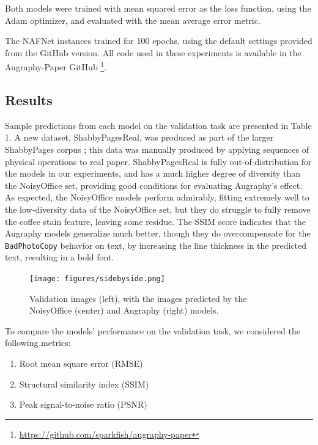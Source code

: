 \documentclass[runningheads]{llncs}
\begin{document}
Both models were trained with mean squared error as the loss function, using the Adam optimizer, and evaluated with the mean average error metric.

The NAFNet instances trained for 100 epochs, using the default settings provided from the GitHub version.
All code used in these experiments is available in the Augraphy-Paper GitHub \footnote{\url{https://github.com/sparkfish/augraphy-paper}}.

\subsection{Results}
Sample predictions from each model on the validation task are presented in Table 1. A new dataset, ShabbyPagesReal, was produced as part of the larger ShabbyPages corpus \cite{ref_ShabbyPages}; this data was manually produced by applying sequences of physical operations to real paper. ShabbyPagesReal is fully out-of-distribution for the models in our experiments, and has a much higher degree of diversity than the NoisyOffice set, providing good conditions for evaluating Augraphy's effect.
As expected, the NoisyOffice models perform admirably, fitting extremely well to the low-diversity data of the NoisyOffice set, but they do struggle to fully remove the coffee stain feature, leaving some residue. The SSIM score indicates that the Augraphy models generalize much better, though they do overcompensate for the \texttt{BadPhotoCopy} behavior on text, by increasing the line thickness in the predicted text, resulting in a bold font.


\begin{figure}\label{fig4}
\texttt{[image: figures/sidebyside.png]}
\caption{Validation images (left), with the images predicted by the NoisyOffice (center) and Augraphy (right) models.}
\end{figure} %

To compare the models' performance on the validation task, we considered the following metrics:
\begin{enumerate}
\item Root mean square error (RMSE)
\item Structural similarity index (SSIM)
\item Peak signal-to-noise ratio (PSNR)
\end{enumerate}
\end{document}
